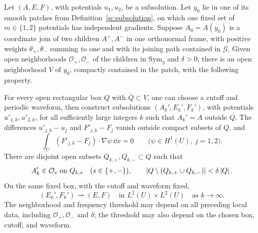\begin{lemma}
\label{sc:local-join}
Let $(A,E,F)$, with potentials $u_1,u_2$, be a subsolution. Let $y_0$
lie in one of its smooth patches from Definition~\ref{sc:subsolution},
on which one fixed set of $m\in\{1,2\}$ potentials has independent
gradients. Suppose $A_0=A(y_0)$ is a coordinate join of
two children $A^+,A^-$ in one orthonormal frame, with positive weights
$\theta_+,\theta_-$ summing to one and with its joining path contained in
$\mathcal G$. Given open neighborhoods $\mathcal O_+,\mathcal O_-$ of
the children in $\mathrm{Sym}_3$ and $\delta>0$, there is an open
neighborhood $V$ of $y_0$, compactly contained in the patch, with the
following property.

For every open rectangular box $Q$ with $\overline Q\subset V$, one
can choose a cutoff and periodic waveform, then construct subsolutions
$(A_k',E_k',F_k')$, with potentials $u'_{1,k},u'_{2,k}$, for all
sufficiently large integers $k$ such that
$A_k'=A$ outside $Q$. The differences $u'_{j,k}-u_j$ and $F'_{j,k}-F_j$
vanish outside compact subsets of $Q$, and
\[
 \int_U(F'_{j,k}-F_j)\cdot\nabla\psi\,\dd x=0
 \qquad\bigl(\psi\in H^1(U),\ j=1,2\bigr).
\]
There are disjoint open subsets $Q_{k,+},Q_{k,-}\subset Q$ such that
\[
 A_k'\in\mathcal O_s\ \hbox{on }Q_{k,s}\quad(s\in\{+,-\}),\qquad
 \left\lvert Q\setminus(Q_{k,+}\cup Q_{k,-})\right\rvert<\delta\left\lvert Q\right\rvert.
\]
On the same fixed box, with the cutoff and waveform fixed,
\[
 (E_k',F_k')\rightharpoonup(E,F)
 \quad\text{in }L^2(U)\times L^2(U)\quad\text{as }k\to\infty.
\]
The neighborhood and frequency threshold may depend on all preceding
local data, including $\mathcal O_+,\mathcal O_-$ and $\delta$; the
threshold may also depend on the chosen box, cutoff, and waveform.
\end{lemma}


